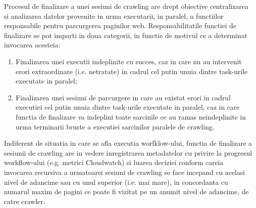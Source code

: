 Procesul de finalizare a unei sesiuni de crawling are drept obiective centralizarea si analizarea datelor provenite in urma executarii, in paralel, a functiilor responsabile pentru parcurgerea paginilor web. Responsabilitatile functiei de finalizare se pot imparti in doua categorii, in functie de motivul ce a determinat invocarea acesteia:

\begin{enumerate}
	\item{Finalizarea unei executii indeplinite cu succes, caz in care nu au intervenit erori extraordinare (i.e. netratate) in cadrul cel putin unuia dintre task-urile executate in paralel;}
	\item{Finalizarea unei sesiuni de parcurgere in care au existat erori in cadrul executiei cel putin unuia dintre task-urile executate in paralel, caz in care functia de finalizare va indeplini toate sarcinile ce au ramas neindeplinite in urma terminarii bruste a executiei sarcinilor paralele de crawling.}
\end{enumerate} 

\noindent
Indiferent de situatia in care se afla executia worfklow-ului, functia de finalizare a sesiunii de crawling are in vedere inregistrarea metadatelor cu privire la progresul workflow-ului (e.g. metrici Cloudwatch) si luarea deciziei conform careia invocarea recursiva a urmatoarei sesiuni de crawling se face incepand cu acelasi nivel de adancime sau cu unul superior (i.e. mai mare), in concordanta cu numarul maxim de pagini ce poate fi vizitat pe un anumit nivel de adancime, de catre crawler.

